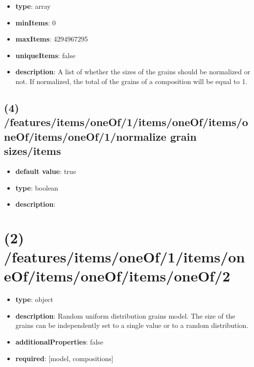 \begin{itemize}[leftmargin=3em]\item {\bf type}: array
\item {\bf minItems}: 0
\item {\bf maxItems}: 4294967295
\item {\bf uniqueItems}: false
\item {\bf description}: A list of whether the sizes of the grains should be normalized or not. If normalized, the total of the grains of a composition will be equal to 1.
\end{itemize}\subsection{(4) /features/items/oneOf/1/items/oneOf/items/oneOf/items/oneOf/1/normalize grain sizes/items}
\begin{itemize}[leftmargin=4em]\item {\bf default value}: true
\item {\bf type}: boolean
\item {\bf description}: 
\end{itemize}\section{(2) /features/items/oneOf/1/items/oneOf/items/oneOf/items/oneOf/2}
\begin{itemize}[leftmargin=2em]\item {\bf type}: object
\item {\bf description}: Random uniform distribution grains model. The size of the grains can be independently set to a single value or to a random distribution.
\item {\bf additionalProperties}: false
\item {\bf required}: [model, compositions]\end{itemize}
